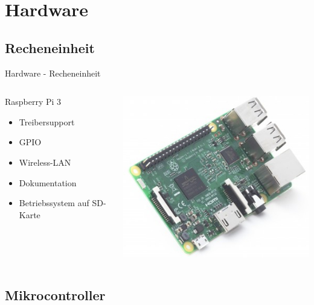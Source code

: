\documentclass{beamer}
\begin{document}
\section{Hardware}

\subsection{Recheneinheit}

\begin{frame}{Hardware - Recheneinheit}

\begin{columns}[T] %
	\begin{column}{.48\textwidth}
		\begin{block}{Raspberry Pi 3}
			\begin{itemize}
				\item Treibersupport
				\item GPIO
				\item Wireless-LAN
				\item Dokumentation
				\item Betriebssystem auf SD-Karte
			\end{itemize}
		\end{block}
	\end{column}%
	\hfill%
	\begin{column}{.48\textwidth}
		\includegraphics{rpi}
	\end{column}%
\end{columns}

\end{frame}

\subsection{Mikrocontroller}
\end{document}
